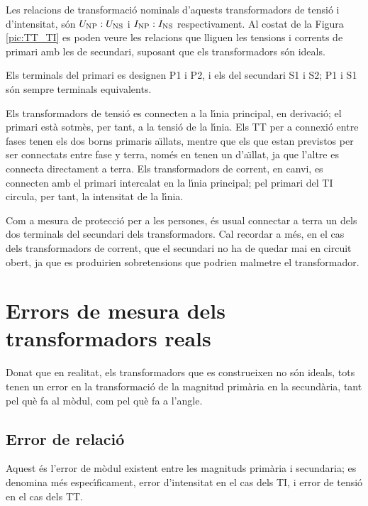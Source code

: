 Les relacions de transformaci\'{o} nominals d'aquests transformadors de
tensi\'{o} i d'intensitat, s\'{o}n $U_\mathrm{NP}:U_\mathrm{NS}$ i
$I_\mathrm{NP}:I_\mathrm{NS}$ respectivament. Al costat de la Figura
\vref{pic:TT_TI} es poden veure les relacions que lliguen les
tensions i corrents de primari amb les de secundari, suposant que
els transformadors s\'{o}n ideals.

Els terminals del primari es designen \textsf{P1} i \textsf{P2}, i
els del secundari \textsf{S1} i \textsf{S2}; \textsf{P1} i
\textsf{S1} s\'{o}n sempre terminals equivalents.

Els transformadors de tensi\'{o} es connecten a la l\'{\i}nia principal, en
derivaci\'{o}; el  primari est\`{a} sotm\`{e}s, per tant, a la tensi\'{o} de la
l\'{\i}nia. Els TT per a connexi\'{o} entre fases tenen els dos borns
primaris a\"{\i}llats, mentre que els que estan previstos per ser
connectats entre fase y terra, nom\'{e}s en tenen un d'a\"{\i}llat, ja que
l'altre es connecta directament a terra. Els transformadors de
corrent, en canvi, es connecten amb el primari intercalat en la
l\'{\i}nia principal;  pel primari del TI circula, per tant, la
intensitat de la l\'{\i}nia.

 Com a mesura de protecci\'{o} per a les persones, \'{e}s usual
connectar a terra un dels dos terminals del secundari dels
transformadors. Cal recordar a m\'{e}s, en el cas dels transformadors de
corrent, que el secundari no ha de quedar mai en circuit obert, ja
que es produirien sobretensions que podrien malmetre el
transformador.

\section{Errors de mesura dels transformadors reals}

Donat que en realitat, els transformadors que es construeixen no s\'{o}n
ideals, tots tenen un error en la transformaci\'{o} de la magnitud
prim\`{a}ria en la secund\`{a}ria, tant pel qu\`{e} fa al m\`{o}dul, com pel qu\`{e} fa
a l'angle.

\subsection{Error de relaci\'{o}}

Aquest \'{e}s l'error de m\`{o}dul existent entre les magnituds prim\`{a}ria i
secundaria; es denomina m\'{e}s espec\'{\i}ficament, error d'intensitat en el
cas dels TI, i error de tensi\'{o} en el cas dels TT.

